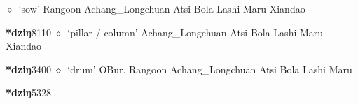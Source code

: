 \begin{list}{}{\leftmargin=1.5em \itemindent=-1.5em}
\hspace{1ex}
         $\diamond$~`sow'
         Rangoon 
\hspace{1ex}
         Achang\_Longchuan 
\hspace{1ex}
         Atsi 
\hspace{1ex}
         Bola 
\hspace{1ex}
         Lashi 
\hspace{1ex}
         Maru 
\hspace{1ex}
         Xiandao 
  \item {\footnotesize \textbf{*dziŋ}}{\tiny 8110}
\hspace{1ex}
         $\diamond$~`pillar / column'
         Achang\_Longchuan 
\hspace{1ex}
         Atsi 
\hspace{1ex}
         Bola 
\hspace{1ex}
         Lashi 
\hspace{1ex}
         Maru 
\hspace{1ex}
         Xiandao 
  \item {\footnotesize \textbf{*dziŋ}}{\tiny 3400}
\hspace{1ex}
         $\diamond$~`drum'
         OBur. 
\hspace{1ex}
         Rangoon 
\hspace{1ex}
         Achang\_Longchuan 
\hspace{1ex}
         Atsi 
\hspace{1ex}
         Bola 
\hspace{1ex}
         Lashi 
\hspace{1ex}
         Maru 
  \item {\footnotesize \textbf{*dziŋ}}{\tiny 5328}
\hspace{1ex}

\end{list}
